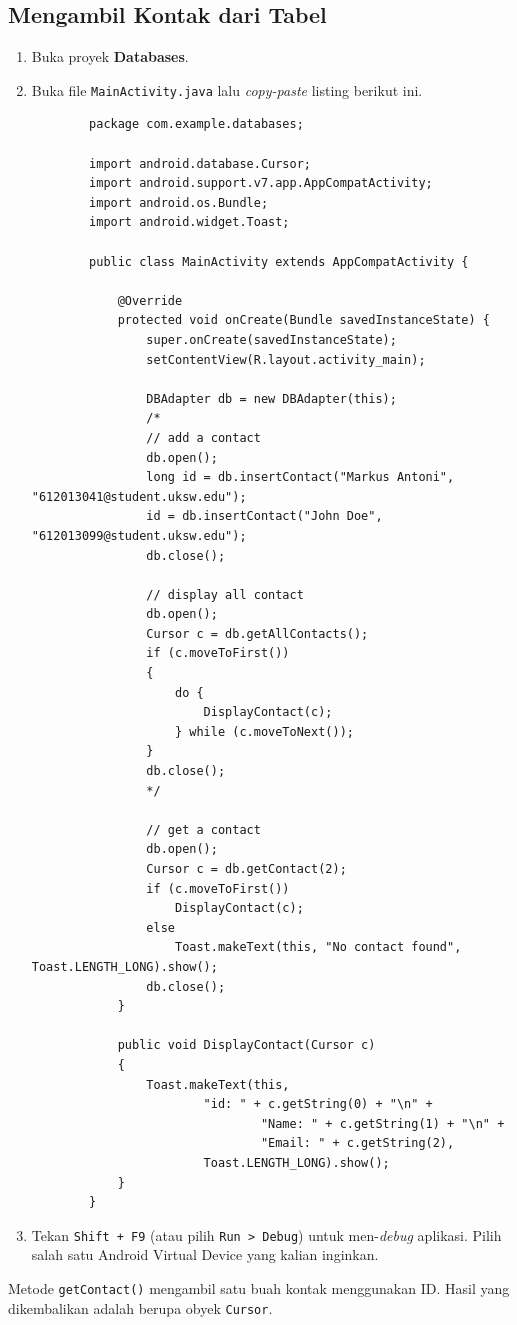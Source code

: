 \documentclass{scrartcl}
\begin{document}
	\subsection{Mengambil Kontak dari Tabel}
	\begin{enumerate}
		\item Buka proyek \textbf{Databases}.
		\item Buka file \texttt{MainActivity.java} lalu \textit{copy-paste} listing berikut ini.
		\begin{verbatim}
		package com.example.databases;
		
		import android.database.Cursor;
		import android.support.v7.app.AppCompatActivity;
		import android.os.Bundle;
		import android.widget.Toast;
		
		public class MainActivity extends AppCompatActivity {
			
			@Override
			protected void onCreate(Bundle savedInstanceState) {
				super.onCreate(savedInstanceState);
				setContentView(R.layout.activity_main);
			
				DBAdapter db = new DBAdapter(this);
				/*
				// add a contact
				db.open();
				long id = db.insertContact("Markus Antoni", "612013041@student.uksw.edu");
				id = db.insertContact("John Doe", "612013099@student.uksw.edu");
				db.close();
				
				// display all contact
				db.open();
				Cursor c = db.getAllContacts();
				if (c.moveToFirst())
				{
					do {
						DisplayContact(c);
					} while (c.moveToNext());
				}
				db.close();
				*/
				
				// get a contact
				db.open();
				Cursor c = db.getContact(2);
				if (c.moveToFirst())
					DisplayContact(c);
				else
					Toast.makeText(this, "No contact found", Toast.LENGTH_LONG).show();
				db.close();
			}
			
			public void DisplayContact(Cursor c)
			{
				Toast.makeText(this,
						"id: " + c.getString(0) + "\n" +
								"Name: " + c.getString(1) + "\n" +
								"Email: " + c.getString(2),
						Toast.LENGTH_LONG).show();
			}
		}
		\end{verbatim}
		\item Tekan \texttt{Shift + F9} (atau pilih \texttt{Run > Debug}) untuk men-\textit{debug} aplikasi. Pilih salah satu Android Virtual Device yang kalian inginkan.
	\end{enumerate}
	Metode \texttt{getContact()} mengambil satu buah kontak menggunakan ID. Hasil yang dikembalikan adalah berupa obyek \texttt{Cursor}.
	
\end{document}
